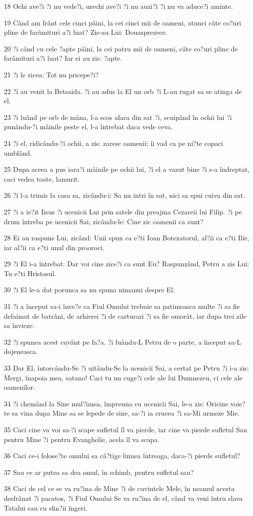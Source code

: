 \par 18 Ochi ave?i ?i nu vede?i, urechi ave?i ?i nu auzi?i ?i nu va aduce?i aminte.
\par 19 Când am frânt cele cinci pâini, la cei cinci mii de oameni, atunci câte co?uri pline de farâmituri a?i luat? Zis-au Lui: Douasprezece.
\par 20 ?i când cu cele ?apte pâini, la cei patru mii de oameni, câte co?uri pline de farâmituri a?i luat? Iar ei au zis: ?apte.
\par 21 ?i le zicea: Tot nu pricepe?i?
\par 22 ?i au venit la Betsaida. ?i au adus la El un orb ?i L-au rugat sa se atinga de el.
\par 23 ?i luând pe orb de mâna, l-a scos afara din sat ?i, scuipând în ochii lui ?i punându-?i mâinile peste el, l-a întrebat daca vede ceva.
\par 24 ?i el, ridicându-?i ochii, a zis: zaresc oamenii; îi vad ca pe ni?te copaci umblând.
\par 25 Dupa aceea a pus iara?i mâinile pe ochii lui, ?i el a vazut bine ?i s-a îndreptat, caci vedea toate, lamurit.
\par 26 ?i l-a trimis la casa sa, zicându-i: Sa nu intri în sat, nici sa spui cuiva din sat.
\par 27 ?i a ie?it Iisus ?i ucenicii Lui prin satele din preajma Cezareii lui Filip. ?i pe drum întreba pe ucenicii Sai, zicându-le: Cine zic oamenii ca sunt?
\par 28 Ei au raspuns Lui, zicând: Unii spun ca e?ti Ioan Botezatorul, al?ii ca e?ti Ilie, iar al?ii ca e?ti unul din prooroci.
\par 29 ?i El i-a întrebat: Dar voi cine zice?i ca sunt Eu? Raspunzând, Petru a zis Lui: Tu e?ti Hristosul.
\par 30 ?i El le-a dat porunca sa nu spuna nimanui despre El.
\par 31 ?i a început sa-i înve?e ca Fiul Omului trebuie sa patimeasca multe ?i sa fie defaimat de batrâni, de arhierei ?i de carturari ?i sa fie omorât, iar dupa trei zile sa învieze.
\par 32 ?i spunea acest cuvânt pe fa?a. ?i luându-L Petru de o parte, a început sa-L dojeneasca.
\par 33 Dar El, întorcându-Se ?i uitându-Se la ucenicii Sai, a certat pe Petru ?i i-a zis: Mergi, înapoia mea, satano! Caci tu nu cuge?i cele ale lui Dumnezeu, ci cele ale oamenilor.
\par 34 ?i chemând la Sine mul?imea, împreuna cu ucenicii Sai, le-a zis: Oricine voie?te sa vina dupa Mine sa se lepede de sine, sa-?i ia crucea ?i sa-Mi urmeze Mie.
\par 35 Caci cine va voi sa-?i scape sufletul îl va pierde, iar cine va pierde sufletul Sau pentru Mine ?i pentru Evanghelie, acela îl va scapa.
\par 36 Caci ce-i folose?te omului sa câ?tige lumea întreaga, daca-?i pierde sufletul?
\par 37 Sau ce ar putea sa dea omul, în schimb, pentru sufletul sau?
\par 38 Caci de cel ce se va ru?ina de Mine ?i de cuvintele Mele, în neamul acesta desfrânat ?i pacatos, ?i Fiul Omului Se va ru?ina de el, când va veni întru slava Tatalui sau cu sfin?ii îngeri.

